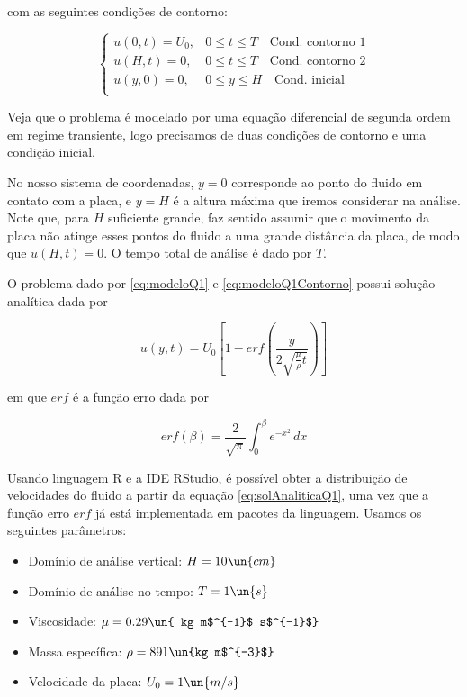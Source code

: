 \noindent com as seguintes condições de contorno:

\begin{equation}\label{eq:modeloQ1Contorno}
    \begin{cases}
        u(0, t) = U_0, & 0 \leq t \leq T \quad \textrm{Cond. contorno 1}\\
        u(H, t) = 0,   & 0 \leq t \leq T \quad \textrm{Cond. contorno 2}\\
        u(y, 0) =  0,  & 0 \leq y \leq H \quad \textrm{Cond. inicial}     \\
    \end{cases}
\end{equation}

Veja que o problema é modelado por uma equação diferencial de segunda ordem
em regime transiente, logo precisamos de duas condições de contorno e uma condição
inicial.

No nosso sistema de coordenadas, $y = 0$ corresponde ao ponto do fluido
em contato com a placa, e $y = H$ é a altura máxima que iremos considerar na análise.
Note que, para $H$ suficiente grande, faz sentido assumir que o movimento da placa
não atinge esses pontos do fluido a uma grande distância da placa, de modo que
$u(H, t) = 0$. O tempo total de análise é dado por $T$.

O problema dado por \eqref{eq:modeloQ1} e \eqref{eq:modeloQ1Contorno} possui solução analítica dada por

\begin{equation}\label{eq:solAnaliticaQ1}
    u(y,t) = U_0 \left[1 - erf\left(\frac{y}{2\sqrt{\frac{\mu}{\rho}t}}\right)\right]
\end{equation}

\noindent em que $erf$ é a função erro dada por

\begin{equation}\label{eq:erf}
    erf(\beta) = \frac{2}{\sqrt{\pi}} \int_0^\beta e^{-x^2} \, dx
\end{equation}

Usando linguagem R e a IDE RStudio,
é possível obter a distribuição de velocidades do fluido
a partir da equação \eqref{eq:solAnaliticaQ1}, uma vez que a função erro $erf$
já está implementada em pacotes da linguagem. Usamos os seguintes parâmetros:

\begin{itemize}
    \item Domínio de análise vertical: $H=10 \un{cm}$
    \item Domínio de análise no tempo: $T=1 \un{s}$
    \item Viscosidade: $\mu=0.29 \un{ kg m$^{-1}$ s$^{-1}$}$
    \item Massa específica: $\rho=891 \un{kg m$^{-3}$}$
    \item Velocidade da placa: $U_0 = 1 \un{m/s}$
\end{itemize}

